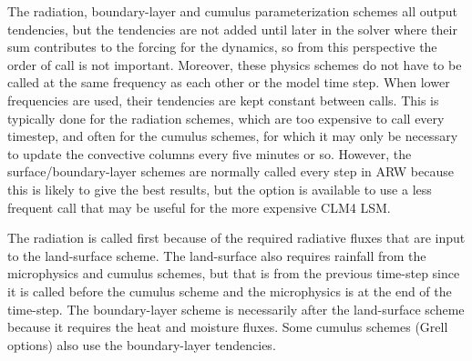 The radiation, boundary-layer and cumulus parameterization schemes all
output tendencies, but the tendencies are not added until later in the solver where their
sum contributes to the forcing for the dynamics, so
from this perspective the order of call is not important. Moreover, these
physics schemes do not have to be called at the same frequency as each other
or the model time step. When lower frequencies are used, their tendencies
are kept constant between calls. This is typically done for the radiation schemes,
which are too expensive to call every timestep, and often for the cumulus schemes, for
which it may only be necessary to update the convective columns every five minutes or so. 
However, the surface/boundary-layer schemes are
normally called every step in ARW because this is likely to give the best results,
but the option is available to use a less frequent call that may be useful for the more
expensive CLM4 LSM.

The radiation is called first because of the required radiative fluxes
that are input to the land-surface scheme. The land-surface also requires rainfall
from the microphysics and cumulus schemes, but that is from the previous time-step
since it is called before the cumulus scheme and the microphysics is at the end of the time-step.
The boundary-layer scheme is necessarily after the land-surface scheme
because it requires the heat and moisture fluxes. Some cumulus schemes (Grell options)
also use the boundary-layer tendencies.

